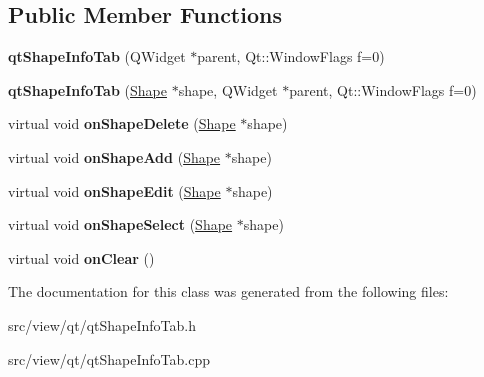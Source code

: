 \subsection*{Public Member Functions}
\begin{DoxyCompactItemize}
\item 
\hypertarget{classqt_shape_info_tab_a1e24b3b05a98ebf3aec79cd7c0c3e8ba}{}{\bfseries qt\+Shape\+Info\+Tab} (Q\+Widget $\ast$parent, Qt\+::\+Window\+Flags f=0)\label{classqt_shape_info_tab_a1e24b3b05a98ebf3aec79cd7c0c3e8ba}

\item 
\hypertarget{classqt_shape_info_tab_ad110fe4c0e748e126ee030a078714b72}{}{\bfseries qt\+Shape\+Info\+Tab} (\hyperlink{class_shape}{Shape} $\ast$shape, Q\+Widget $\ast$parent, Qt\+::\+Window\+Flags f=0)\label{classqt_shape_info_tab_ad110fe4c0e748e126ee030a078714b72}

\item 
\hypertarget{classqt_shape_info_tab_a295e58538f2cebdfd9a4b5b40bf1e16c}{}virtual void {\bfseries on\+Shape\+Delete} (\hyperlink{class_shape}{Shape} $\ast$shape)\label{classqt_shape_info_tab_a295e58538f2cebdfd9a4b5b40bf1e16c}

\item 
\hypertarget{classqt_shape_info_tab_aec9838aa8baceca3a6045b5950e2881d}{}virtual void {\bfseries on\+Shape\+Add} (\hyperlink{class_shape}{Shape} $\ast$shape)\label{classqt_shape_info_tab_aec9838aa8baceca3a6045b5950e2881d}

\item 
\hypertarget{classqt_shape_info_tab_acc7e4b91ec5eff4e8a785730a21a44f8}{}virtual void {\bfseries on\+Shape\+Edit} (\hyperlink{class_shape}{Shape} $\ast$shape)\label{classqt_shape_info_tab_acc7e4b91ec5eff4e8a785730a21a44f8}

\item 
\hypertarget{classqt_shape_info_tab_a785dda79e10dfd05845e08ab1b4cdfd9}{}virtual void {\bfseries on\+Shape\+Select} (\hyperlink{class_shape}{Shape} $\ast$shape)\label{classqt_shape_info_tab_a785dda79e10dfd05845e08ab1b4cdfd9}

\item 
\hypertarget{classqt_shape_info_tab_ae7f1b60ab068ec55b67830742e7534d8}{}virtual void {\bfseries on\+Clear} ()\label{classqt_shape_info_tab_ae7f1b60ab068ec55b67830742e7534d8}

\end{DoxyCompactItemize}


The documentation for this class was generated from the following files\+:\begin{DoxyCompactItemize}
\item 
src/view/qt/qt\+Shape\+Info\+Tab.\+h\item 
src/view/qt/qt\+Shape\+Info\+Tab.\+cpp\end{DoxyCompactItemize}

